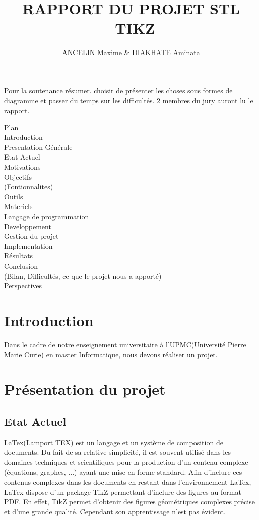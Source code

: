 \documentclass[a4paper]{report}
\title{RAPPORT DU PROJET STL \\ TIKZ}
\author{ANCELIN Maxime & DIAKHATE Aminata}
\begin{document}

 \maketitle
 \tableofcontents
 \newpage

Pour la soutenance résumer. choisir de présenter 
les choses sous formes de diagramme et passer du 
temps sur les difficultés.
2 membres du jury auront lu le rapport. 

	Plan\\
 Introduction\\
 Presentation Générale \\
   Etat Actuel\\
   Motivations\\ 
   Objectifs\\ 
   (Fontionnalites)\\
 Outils\\ 
   Materiels\\ 
   Langage de programmation\\ 
 Developpement\\ 
   Gestion du projet\\
   Implementation\\
   Résultats\\
 Conclusion\\
   (Bilan, Difficultés, ce que le projet nous a apporté)\\ 
 Perspectives

 \newpage
 \section{Introduction}
  Dans le cadre de notre enseignement universitaire à l'UPMC(Université Pierre Marie Curie) en master Informatique, nous devons réaliser un projet. 
  
  \section{Présentation du projet}
  \subsection{Etat Actuel}
  LaTex(Lamport TEX) est un langage et un système de composition de documents. Du fait de sa relative simplicité, il est souvent utilisé dans les domaines techniques et scientifiques pour la production d'un contenu complexe (équations, graphes, ...) ayant une mise en forme standard. Afin d'inclure ces contenus complexes dans les documents en restant dans l'environnement LaTex, LaTex dispose d'un package TikZ permettant d'inclure des figures au format PDF. En effet, TikZ permet d'obtenir des figures géométriques complexes précise et d'une grande qualité. Cependant son apprentissage n'est pas évident. 
\end{document}
